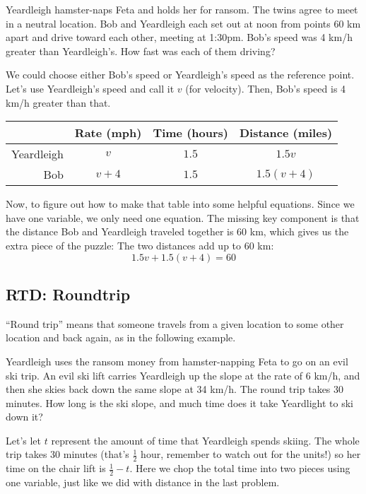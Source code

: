 \begin{boxedex}
Yeardleigh hamster-naps Feta and holds her for ransom. The twins agree to meet in a neutral location. Bob and Yeardleigh each set out at noon from points 60 km apart and drive toward each other, meeting at 1:30pm. Bob's speed was 4 km/h greater than Yeardleigh's. How fast was each of them driving?
\end{boxedex}

We could choose either Bob's speed or Yeardleigh's speed as the reference point. Let's use Yeardleigh's speed and call it $v$ (for velocity). Then, Bob's speed is 4 km/h greater than that.

\begin{center}
\begin{tabular}{r|ccc}
				& Rate (mph)			& Time (hours)		& Distance (miles)\\\hline
Yeardleigh		& $v$					& $1.5$				& $1.5v$\\
Bob				& $v+4$				& $1.5$				& $1.5(v+4)$\\
\end{tabular}
\end{center}

Now, to figure out how to make that table into some helpful equations. Since we have one variable, we only need one equation. The missing key component is that the distance Bob and Yeardleigh traveled together is 60 km, which gives us the extra piece of the puzzle: The two distances add up to 60 km:
\[
1.5v + 1.5(v+4) = 60
\]

\subsection*{RTD: Roundtrip}
``Round trip'' means that someone travels from a given location to some other location and back again, as in the following example.

\begin{boxedex}
Yeardleigh uses the ransom money from hamster-napping Feta to go on an evil ski trip. An evil ski lift carries Yeardleigh up the slope at the rate of 6 km/h, and then she skies back down the same slope at 34 km/h. The round trip takes 30 minutes. How long is the ski slope, and much time does it take Yeardlight to ski down it?
\end{boxedex}

Let's let $t$ represent the amount of time that Yeardleigh spends skiing. The whole trip takes 30 minutes (that's $\frac{1}{2}$ hour, remember to watch out for the units!) so her time on the chair lift is $\frac{1}{2} - t$. Here we chop the total time into two pieces using one variable, just like we did with distance in the last problem.

